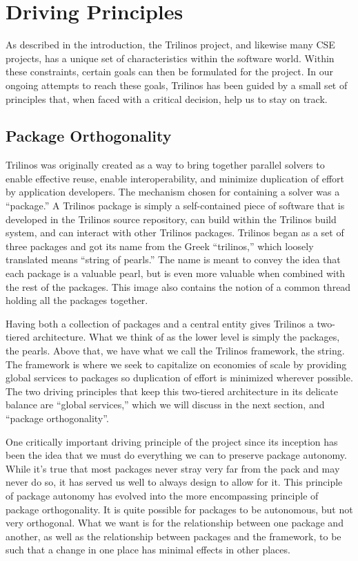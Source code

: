 \documentclass[12pt,relax]{article}
\begin{document}
\section{Driving Principles}
\label{Section:Driving Principles}

As described in the introduction, the Trilinos project, and likewise many CSE
projects, has a unique set of characteristics within the software world.
Within these constraints, certain goals can then be formulated for the project.
In our ongoing attempts to reach these goals, Trilinos has been guided by a
small set of principles that, when faced with a critical decision, help us to
stay on track.

\subsection{Package Orthogonality}

Trilinos was originally created as a way to bring together parallel solvers
to enable effective reuse, enable interoperability, and minimize duplication of
effort by application developers.  The mechanism chosen for containing a solver
was a ``package.''  A Trilinos package is simply a self-contained piece of
software that is developed in the Trilinos source repository, can build within
the Trilinos build system, and can interact with other Trilinos packages.
Trilinos began as a set of three packages and got its name from the Greek 
``trilinos,'' which loosely translated means ``string of pearls.''  The name is
meant to convey the idea that each package is a valuable pearl, but is even
more valuable when combined with the rest of the packages.  This image also
contains the notion of a common thread holding all the packages together.

Having both a collection of packages and a central entity gives Trilinos a
two-tiered architecture.  What we think of as the lower level is simply the
packages, the pearls.  Above that, we have what we call the Trilinos framework,
the string.  The framework is where we seek to capitalize on economies of scale
by providing global services to packages so duplication of effort is minimized
wherever possible.  The two driving principles that keep this two-tiered
architecture in its delicate balance are ``global services,'' which we will
discuss in the next section, and ``package orthogonality''.

One critically important driving principle of the project since its inception
has been the idea that we must do everything we can to preserve package
autonomy.  While it's true that most packages never stray very far from the
pack and may never do so, it has served us well to always design to allow for
it.  This principle of package autonomy has evolved into the more
encompassing principle of package orthogonality.  It is quite possible for
packages to be autonomous, but not very orthogonal.  What we want is for the
relationship between one package and another, as well as the relationship
between packages and the framework, to be such that a change in one place has
minimal effects in other places.
\end{document}
